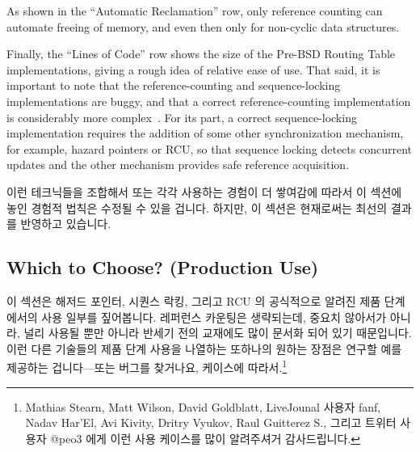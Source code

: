 As shown in the ``Automatic Reclamation'' row, only reference
counting can automate freeing of memory, and even then only
for non-cyclic data structures.

Finally, the ``Lines of Code'' row shows the size of the Pre-BSD
Routing Table implementations, giving a rough idea of relative ease of use.
That said, it is important to note that the reference-counting and
sequence-locking implementations are buggy, and that a correct
reference-counting implementation is considerably
more complex~\cite{Valois95a,MagedMichael95a}.
For its part, a correct sequence-locking implementation requires
the addition of some other synchronization mechanism, for example,
hazard pointers or RCU, so that sequence locking detects concurrent
updates and the other mechanism provides safe reference acquisition.
\fi

이런 테크닉들을 조합해서 또는 각각 사용하는 경험이 더 쌓여감에 따라서 이 섹션에
놓인 경험적 법칙은 수정될 수 있을 겁니다.
하지만, 이 섹션은 현재로써는 최선의 결과를 반영하고 있습니다.
\iffalse

As more experience is gained using these techniques, both separately
and in combination, the rules of thumb laid out in this section will
need to be refined.
However, this section does reflect the current state of the art.
\fi

\subsection{Which to Choose? (Production Use)}
\label{sec:defer:Which to Choose? (Production Use)}

이 섹션은 해저드 포인터, 시퀀스 락킹, 그리고 RCU 의 공식적으로 알려진 제품
단계에서의 사용 일부를 짚어봅니다.
레퍼런스 카운팅은 생략되는데, 중요치 않아서가 아니라, 널리 사용될 뿐만 아니라
반세기 전의 교재에도 많이 문서화 되어 있기 때문입니다.
이런 다른 기술들의 제품 단계 사용을 나열하는 또하나의 원하는 장점은 연구할 예를
제공하는 겁니다---또는 버그를 찾거나요, 케이스에 따라서.\footnote{
	Mathias Stearn, Matt Wilson, David Goldblatt, LiveJounal 사용자 fanf,
	Nadav Har'El, Avi Kivity, Dritry Vyukov, Raul Guitterez S., 그리고
	트위터 사용자 @peo3 에게 이런 사용 케이스를 많이 알려주셔거
	감사드립니다.}
\iffalse

This section points out a few publicly visible production uses of
hazard pointers, sequence locking, and RCU.
Reference counting is omitted, not because it is unimportant, but rather
because it is not only used pervasively, but heavily documented in textbooks
going back a half century.
One of the hoped-for benefits of listing production uses of these other
techniques is to provide examples to study---or to find bugs in, as
the case may be.\footnote{
	Kudos to Mathias Stearn, Matt Wilson, David Goldblatt,
	LiveJournal user fanf, Nadav Har'El, Avi Kivity, Dmitry Vyukov,
	Raul Guitterez S., and Twitter user @peo3 for locating a
	great many of these use cases.}
\fi

